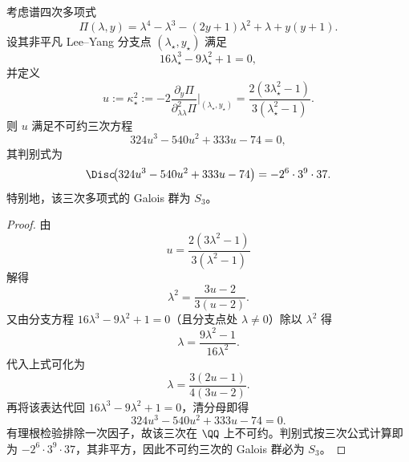 \begin{theorem}\label{thm:killo-leyang-kappa-square-cubic-field}
考虑谱四次多项式
\[
\Pi(\lambda,y)=\lambda^4-\lambda^3-(2y+1)\lambda^2+\lambda+y(y+1).
\]
设其非平凡 Lee--Yang 分支点 \((\lambda_\star,y_\star)\) 满足
\[
16\lambda_\star^3-9\lambda_\star^2+1=0,
\]
并定义
\[
u:=\kappa_\star^2
:=
-2\frac{\partial_y\Pi}{\partial_{\lambda\lambda}^2\Pi}\Big|_{(\lambda_\star,y_\star)}
=\frac{2(3\lambda_\star^2-1)}{3(\lambda_\star^2-1)}.
\]
则 \(u\) 满足不可约三次方程
\[
324u^3-540u^2+333u-74=0,
\]
其判别式为
\[
\Disc\!\bigl(324u^3-540u^2+333u-74\bigr)
=-2^{6}\cdot 3^{9}\cdot 37.
\]
特别地，该三次多项式的 Galois 群为 \(S_3\)。
\end{theorem}
\begin{proof}
由
\[
u=\frac{2(3\lambda^2-1)}{3(\lambda^2-1)}
\]
解得
\[
\lambda^2=\frac{3u-2}{3(u-2)}.
\]
又由分支方程 \(16\lambda^3-9\lambda^2+1=0\)（且分支点处 \(\lambda\neq 0\)）除以 \(\lambda^2\) 得
\[
\lambda=\frac{9\lambda^2-1}{16\lambda^2}.
\]
代入上式可化为
\[
\lambda=\frac{3(2u-1)}{4(3u-2)}.
\]
再将该表达代回 \(16\lambda^3-9\lambda^2+1=0\)，清分母即得
\[
324u^3-540u^2+333u-74=0.
\]
有理根检验排除一次因子，故该三次在 \(\QQ\) 上不可约。判别式按三次公式计算即为
\(-2^{6}\cdot 3^{9}\cdot 37\)，其非平方，因此不可约三次的 Galois 群必为 \(S_3\)。
\end{proof}

